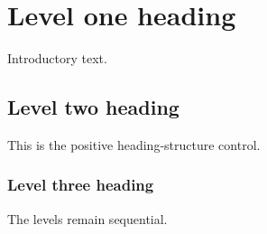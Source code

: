 \documentclass[11pt]{article}
\begin{document}
\section{Level one heading}
Introductory text.
\subsection{Level two heading}
This is the positive heading-structure control.
\subsubsection{Level three heading}
The levels remain sequential.
\end{document}
